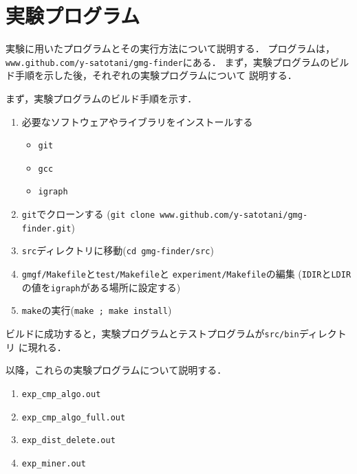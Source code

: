 
\chapter{実験プログラム}
\label{chap:experimental-program}
実験に用いたプログラムとその実行方法について説明する．
プログラムは，\verb|www.github.com/y-satotani/gmg-finder|にある．
まず，実験プログラムのビルド手順を示した後，それぞれの実験プログラムについて
説明する．

まず，実験プログラムのビルド手順を示す．
\begin{enumerate}
\item 必要なソフトウェアやライブラリをインストールする
  \begin{itemize}
  \item \verb|git|
  \item \verb|gcc|
  \item \verb|igraph|
  \end{itemize}
\item \verb|git|でクローンする
  (\verb|git clone www.github.com/y-satotani/gmg-finder.git|)
\item \verb|src|ディレクトリに移動(\verb|cd gmg-finder/src|)
\item \verb|gmgf/Makefile|と\verb|test/Makefile|と
  \verb|experiment/Makefile|の編集
  (\verb|IDIR|と\verb|LDIR|の値を\verb|igraph|がある場所に設定する)
\item \verb|make|の実行(\verb|make ; make install|)
\end{enumerate}
ビルドに成功すると，実験プログラムとテストプログラムが\verb|src/bin|ディレクトリ
に現れる．

以降，これらの実験プログラムについて説明する．
\begin{enumerate}
\item \texttt{exp\_cmp\_algo.out}
\item \texttt{exp\_cmp\_algo\_full.out}
\item \texttt{exp\_dist\_delete.out}
\item \texttt{exp\_miner.out}
\end{enumerate}

